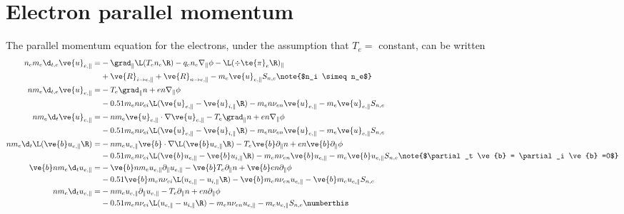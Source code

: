 \section{Electron parallel momentum}
The parallel momentum equation for the electrons, under the assumption that $T_e=$
constant, can be written
%
\begin{align*}
 n_em_e\d_{t,e} \ve{u}_{e,\|}
 =&
 - \grad_\| \L(T_e n_e\R)
 - q_en_e \nabla_\|\phi
 - \L(\div\te{\pi}_e\R)_\|
 \\
 &
 + \ve{R}_{i\to e, \|}
 + \ve{R}_{n\to e, \|}
 - m_e\ve{u}_{e,\|}S_{n,e}
 \note{$n_i \simeq n_e$}
 \\
%
%
 n m_e\d_{t,e} \ve{u}_{e,\|}
 =&
 - T_e \grad_\| n
 + en \nabla_\|\phi
 \\
 &
 - 0.51 m_e n \nu_{ei}
 \L(
    \ve{u}_{e,\|}
    -
    \ve{u}_{i,\|}
 \R)
 - m_e n \nu_{en} \ve{u}_{e,\|}
 - m_e\ve{u}_{e,\|}S_{n,e}
 \\
%
%
n m_e\d_{t} \ve{u}_{e,\|}
 =&
 - n m_e \ve{u}_{e,\|} \cdot \nabla \ve{u}_{e,\|}
 - T_e \grad_\| n
 + en \nabla_\|\phi
 \\
 &
 - 0.51 m_e n \nu_{ei}
 \L(
    \ve{u}_{e,\|}
    -
    \ve{u}_{i,\|}
 \R)
 - m_e n \nu_{en}
    \ve{u}_{e,\|}
 - m_e\ve{u}_{e,\|}S_{n,e}
 \\
%
%
n m_e\d_{t} \L( \ve{b}u_{e,\|} \R)
 =&
 - n m_e u_{e,\|} \ve{b} \cdot \nabla \L(\ve{b}u_{e,\|}\R)
 - T_e \ve{b}\partial_\| n
 + en  \ve{b}\partial_\|\phi
 \\
 &
 - 0.51 m_e n \nu_{ei}
 \L(
    \ve{b}u_{e,\|}
    -
    \ve{b}u_{i,\|}
 \R)
 - m_e n \nu_{en}
    \ve{b}u_{e,\|}
 - m_e\ve{b}u_{e,\|}S_{n,e}
  \note{$\partial_t \ve{b} = \partial_i \ve{b} =0$}
 \\
%
%
\ve{b}n m_e\d_{t}  u_{e,\|}
 =&
 - \ve{b} n m_e u_{e,\|} \partial_\| u_{e,\|}
 - \ve{b}T_e \partial_\| n
 + \ve{b}en  \partial_\|\phi
 \\
 &
 - 0.51\ve{b} m_e n \nu_{ei}
 \L(
    u_{e,\|}
    -
    u_{i,\|}
 \R)
 - \ve{b}m_e n \nu_{en} u_{e,\|}
 - \ve{b}m_eu_{e,\|}S_{n,e}
 \\
%
%
n m_e\d_{t}  u_{e,\|}
 =&
 - n m_e u_{e,\|} \partial_\| u_{e,\|}
 - T_e \partial_\| n
 + en  \partial_\|\phi
 \\
 &
 - 0.51 m_e n \nu_{ei}
 \L(
    u_{e,\|}
    -
    u_{i,\|}
 \R)
 - m_e n \nu_{en} u_{e,\|}
 - m_eu_{e,\|}S_{n,e}
  \numberthis
  \label{eq:non_norm_e_mom}
\end{align*}
%

